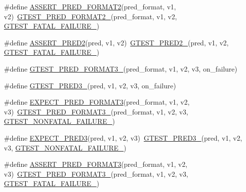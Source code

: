 \begin{DoxyCompactItemize}
\item 
\#define \hyperlink{fused-src_2gtest_2gtest_8h_ac452685a1a98ea3d96eb956a062ee210}{A\-S\-S\-E\-R\-T\-\_\-\-P\-R\-E\-D\-\_\-\-F\-O\-R\-M\-A\-T2}(pred\-\_\-format, v1, v2)~\hyperlink{gtest__pred__impl_8h_a115c18d1f752b7f091d577fb69cac372}{G\-T\-E\-S\-T\-\_\-\-P\-R\-E\-D\-\_\-\-F\-O\-R\-M\-A\-T2\-\_\-}(pred\-\_\-format, v1, v2, \hyperlink{gtest-internal_8h_a0f9a4c3ea82cc7bf4478eaffdc168358}{G\-T\-E\-S\-T\-\_\-\-F\-A\-T\-A\-L\-\_\-\-F\-A\-I\-L\-U\-R\-E\-\_\-})
\item 
\#define \hyperlink{fused-src_2gtest_2gtest_8h_a4e9b777cce4e5423f4c2e491be7aa818}{A\-S\-S\-E\-R\-T\-\_\-\-P\-R\-E\-D2}(pred, v1, v2)~\hyperlink{gtest__pred__impl_8h_ac560264104bd030b64034505d294a7b6}{G\-T\-E\-S\-T\-\_\-\-P\-R\-E\-D2\-\_\-}(pred, v1, v2, \hyperlink{gtest-internal_8h_a0f9a4c3ea82cc7bf4478eaffdc168358}{G\-T\-E\-S\-T\-\_\-\-F\-A\-T\-A\-L\-\_\-\-F\-A\-I\-L\-U\-R\-E\-\_\-})
\item 
\#define \hyperlink{fused-src_2gtest_2gtest_8h_a49cdf8707268ee932bb772d879a226cc}{G\-T\-E\-S\-T\-\_\-\-P\-R\-E\-D\-\_\-\-F\-O\-R\-M\-A\-T3\-\_\-}(pred\-\_\-format, v1, v2, v3, on\-\_\-failure)
\item 
\#define \hyperlink{fused-src_2gtest_2gtest_8h_af30518f03233bc4486b55284b0827eb8}{G\-T\-E\-S\-T\-\_\-\-P\-R\-E\-D3\-\_\-}(pred, v1, v2, v3, on\-\_\-failure)
\item 
\#define \hyperlink{fused-src_2gtest_2gtest_8h_a7285708fa5d37d6d8ed5b5e59da08bae}{E\-X\-P\-E\-C\-T\-\_\-\-P\-R\-E\-D\-\_\-\-F\-O\-R\-M\-A\-T3}(pred\-\_\-format, v1, v2, v3)~\hyperlink{gtest__pred__impl_8h_a49cdf8707268ee932bb772d879a226cc}{G\-T\-E\-S\-T\-\_\-\-P\-R\-E\-D\-\_\-\-F\-O\-R\-M\-A\-T3\-\_\-}(pred\-\_\-format, v1, v2, v3, \hyperlink{gtest-internal_8h_a6cb7482cfa03661a91c698eb5895f642}{G\-T\-E\-S\-T\-\_\-\-N\-O\-N\-F\-A\-T\-A\-L\-\_\-\-F\-A\-I\-L\-U\-R\-E\-\_\-})
\item 
\#define \hyperlink{fused-src_2gtest_2gtest_8h_a0a0aff2564ea84c7eb3517ac8eda04da}{E\-X\-P\-E\-C\-T\-\_\-\-P\-R\-E\-D3}(pred, v1, v2, v3)~\hyperlink{gtest__pred__impl_8h_af30518f03233bc4486b55284b0827eb8}{G\-T\-E\-S\-T\-\_\-\-P\-R\-E\-D3\-\_\-}(pred, v1, v2, v3, \hyperlink{gtest-internal_8h_a6cb7482cfa03661a91c698eb5895f642}{G\-T\-E\-S\-T\-\_\-\-N\-O\-N\-F\-A\-T\-A\-L\-\_\-\-F\-A\-I\-L\-U\-R\-E\-\_\-})
\item 
\#define \hyperlink{fused-src_2gtest_2gtest_8h_a494e3b8dc22f4765f7e041f16c930e3d}{A\-S\-S\-E\-R\-T\-\_\-\-P\-R\-E\-D\-\_\-\-F\-O\-R\-M\-A\-T3}(pred\-\_\-format, v1, v2, v3)~\hyperlink{gtest__pred__impl_8h_a49cdf8707268ee932bb772d879a226cc}{G\-T\-E\-S\-T\-\_\-\-P\-R\-E\-D\-\_\-\-F\-O\-R\-M\-A\-T3\-\_\-}(pred\-\_\-format, v1, v2, v3, \hyperlink{gtest-internal_8h_a0f9a4c3ea82cc7bf4478eaffdc168358}{G\-T\-E\-S\-T\-\_\-\-F\-A\-T\-A\-L\-\_\-\-F\-A\-I\-L\-U\-R\-E\-\_\-})

\end{DoxyCompactItemize}
